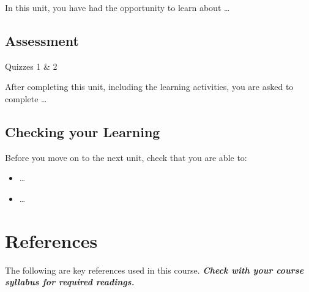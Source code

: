 \documentclass[
]{book}
\providecommand{\tightlist}{%
  \setlength{\itemsep}{0pt}\setlength{\parskip}{0pt}}
\theoremstyle{definition}
\theoremstyle{definition}
\theoremstyle{definition}
\theoremstyle{definition}
\theoremstyle{remark}
\begin{document}
In this unit, you have had the opportunity to learn about \ldots{}

\hypertarget{assessment-5}{%
\section*{Assessment}\label{assessment-5}}

\begin{assessment}
{Quizzes 1 \& 2}

After completing this unit, including the learning activities, you are asked to complete \ldots{}
\end{assessment}

\hypertarget{checking-your-learning-5}{%
\section*{Checking your Learning}\label{checking-your-learning-5}}

\begin{progress}
Before you move on to the next unit, check that you are able to:

\begin{itemize}
\tightlist
\item
  \ldots{}
\item
  \ldots{}
\end{itemize}
\end{progress}

\hypertarget{references}{%
\chapter*{References}\label{references}}

The following are key references used in this course. \textbf{\emph{Check with your course syllabus for required readings.}}

  
\end{document}
